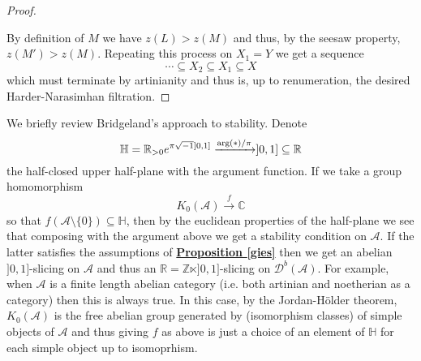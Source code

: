 \begin{proof}
\begin{center}
\end{center}
By definition of $M$ we have $z(L) > z(M)$ and thus, by the seesaw property, $z(M')>z(M)$. Repeating this process on $X_1=Y$ we get a sequence $$\cdots \subseteq X_2 \subseteq X_1 \subseteq X$$
which must terminate by artinianity and thus is, up to renumeration, the desired Harder-Narasimhan filtration.
\end{proof}

\begin{exmp}\label{brie}
We briefly review Bridgeland's approach to stability. Denote $$\mathbb{H}=\mathbb{R}_{>0}e^{\pi \sqrt{-1} ]0,1]} \xrightarrow{ \textnormal{arg}(*) /\pi} ]0,1] \subseteq \mathbb{R}$$
the half-closed upper half-plane with the argument function. If we take a group homomorphism $$K_0(\mathscr{A}) \overset{f}{\longrightarrow} \mathbb{C}$$ 
so that $f(\mathscr{A} \setminus \{ 0 \}) \subseteq \mathbb{H}$, then by the euclidean properties of the half-plane we see that composing with the argument above we get a stability condition on $\mathscr{A}$. If the latter satisfies the assumptions of \hyperref[gies]{\textbf{Proposition \ref*{gies}}} then we get an abelian $]0,1]$-slicing on $\mathscr{A}$ and thus an $\mathbb{R}=\mathbb{Z} \ltimes ]0,1]$-slicing on $\mathscr{D}^b(\mathscr{A})$. For example, when $\mathscr{A}$ is a finite length abelian category (i.e. both artinian and noetherian as a category) then this is always true. In this case, by the Jordan-H\"{o}lder theorem, $K_0(\mathscr{A})$ is the free abelian group generated by (isomorphism classes) of simple objects of $\mathscr{A}$ and thus giving $f$ as above is just a choice of an element of $\mathbb{H}$ for each simple object up to isomoprhism. 
\end{exmp}

